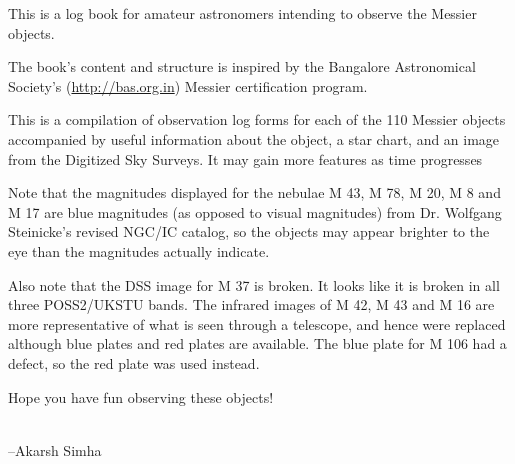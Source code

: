 This is a log book for amateur astronomers intending to observe the
Messier objects.

The book's content and structure is inspired by the Bangalore
Astronomical Society's (\url{http://bas.org.in}) Messier certification
program.

This is a compilation of observation log forms for each of the 110
Messier objects accompanied by useful information about the object, a
star chart, and an image from the Digitized Sky Surveys. It may gain
more features as time progresses

Note that the magnitudes displayed for the nebulae M 43, M 78, M 20, M
8 and M 17 are blue magnitudes (as opposed to visual magnitudes) from
Dr. Wolfgang Steinicke's revised NGC/IC catalog, so the objects may
appear brighter to the eye than the magnitudes actually indicate.

Also note that the DSS image for M 37 is broken. It looks like it is
broken in all three POSS2/UKSTU bands. The infrared images of M 42, M
43 and M 16 are more representative of what is seen through a
telescope, and hence were replaced although blue plates and red plates
are available. The blue plate for M 106 had a defect, so the red plate
was used instead.

Hope you have fun observing these objects!

\\

\hfill --Akarsh Simha
